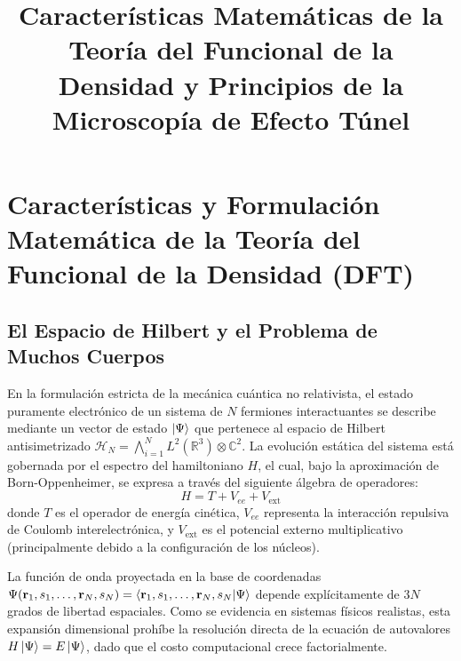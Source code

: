 \documentclass[pdflatex,sn-mathphys-num]{sn-jnl}
\theoremstyle{thmstyleone}%
\theoremstyle{thmstyletwo}%
\theoremstyle{thmstylethree}%
\begin{document}
\title[Fundamentos de DFT y STM]{Características Matemáticas de la Teoría del
Funcional de la Densidad y Principios de la Microscopía de Efecto Túnel}

\author{ }


\maketitle

\section{Características y Formulación Matemática de la Teoría del Funcional de
la Densidad (DFT)}

\subsection{El Espacio de Hilbert y el Problema de Muchos Cuerpos}

En la formulación estricta de la mecánica cuántica no relativista, el estado
puramente electrónico de un sistema de $N$ fermiones interactuantes se describe
mediante un vector de estado $\ket{\Psi}$ que pertenece al espacio de Hilbert
antisimetrizado $\mathcal{H}_N = \bigwedge_{i=1}^N L^2(\mathbb{R}^3) \otimes
\mathbb{C}^2$. La evolución estática del sistema está gobernada por el espectro
del hamiltoniano $H$, el cual, bajo la aproximación de Born-Oppenheimer,
se expresa a través del siguiente álgebra de operadores:
\begin{equation}
    H = T + V_{ee} + V_{\text{ext}}
\end{equation}
donde $T$ es el operador de energía cinética, $V_{ee}$ representa la interacción repulsiva de Coulomb
interelectrónica, y $V_{\text{ext}}$ es el potencial externo multiplicativo
(principalmente debido a la configuración de los núcleos).

La función de onda proyectada en la base de coordenadas $\Psi(\mathbf{r}_1, s_1, \dots, \mathbf{r}_N, s_N) = \braket{\mathbf{r}_1, s_1, \dots, \mathbf{r}_N, s_N | \Psi}$ depende explícitamente de $3N$ grados de libertad espaciales. Como se evidencia en sistemas físicos realistas, esta expansión dimensional prohíbe la resolución directa de la ecuación de autovalores $H\ket{\Psi} = E\ket{\Psi}$, dado que el costo computacional crece factorialmente.
\end{document}
